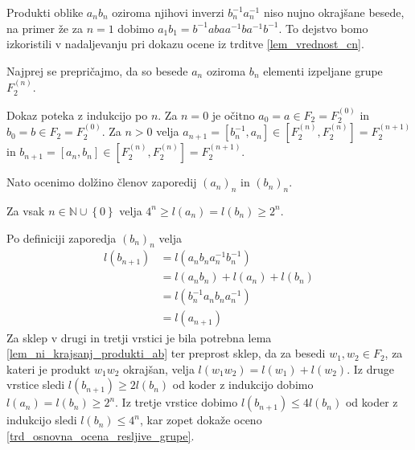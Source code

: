 \begin{opomba}
Produkti oblike $a_n b_n$ oziroma njihovi inverzi $b_n ^{-1} a_n ^{-1}$ niso nujno okrajšane besede, na primer že za $n = 1$ dobimo $a_1 b_1 = b^{-1} a b a a^{-1} b a^{-1} b^{-1}$. To dejstvo bomo izkoristili v nadaljevanju pri dokazu ocene iz trditve \ref{lem_vrednost_cn}. 
\end{opomba}

Najprej se prepričajmo, da so besede $a_n$ oziroma $b_n$ elementi izpeljane grupe $F_2^{(n)}$.

\begin{lema}
\label{lem_besede_ab_so_elementi_izpeljane_grupe}
\end{lema}
\begin{dokaz}
    Dokaz poteka z indukcijo po $n$. Za $n = 0$ je očitno $a_0 = a \in F_2 = F_2^{(0)}$ in $b_0 = b \in F_2 = F_2^{(0)}$. Za $n > 0$ velja $a_{n + 1} = [b_n^{-1}, a_n] \in \left[ F_2^{(n)}, F_2^{(n)} \right] = F_2^{(n + 1)}$ in $b_{n+1} = [a_{n}, b_{n}] \in  \left[ F_2^{(n)}, F_2^{(n)} \right] = F_2^{(n + 1)}$. 
\end{dokaz}

Nato ocenimo dolžino členov zaporedij $(a_{n})_n$ in $(b_{n})_n$.

\begin{lema}
\label{lem_ocena_dolzine_clenov_zaporedij_ab}
Za vsak $n \in \mathbb{N} \cup \left\{ 0\right\}$ velja $4^{n} \ge l(a_{n}) = l(b_{n}) \ge 2^{n}$.
\end{lema}
\begin{dokaz}
Po definiciji zaporedja $(b_n)_n$ velja \begin{align*}
    l(b_{n+1}) &= l(a_{n} b_{n} a_{n}^{-1} b_{n}^{-1}) \\
     &= l(a_{n} b_{n}) + l(a_{n}) + l(b_{n}) \\
     &= l(b_{n}^{-1} a_{n} b_{n} a_{n}^{-1}) \\
     &= l(a_{n + 1})
\end{align*}
Za sklep v drugi in tretji vrstici je bila potrebna lema \ref{lem_ni_krajsanj_produkti_ab} ter preprost sklep, da za besedi $w_1, w_2 \in F_2$, za kateri je produkt $w_1 w_2$ okrajšan, velja $l(w_1 w_2) = l(w_1) + l(w_2)$.
Iz druge vrstice sledi $l(b_{n+1}) \ge  2 l(b_n)$ od koder z indukcijo dobimo $l(a_{n}) = l(b_{n}) \ge 2^{n}$. Iz tretje vrstice dobimo $l(b_{n+1}) \le 4 l(b_n)$ od koder z indukcijo sledi $l(b_n) \le 4^{n}$, kar zopet dokaže oceno \ref{trd_osnovna_ocena_resljive_grupe}.    
\end{dokaz}

